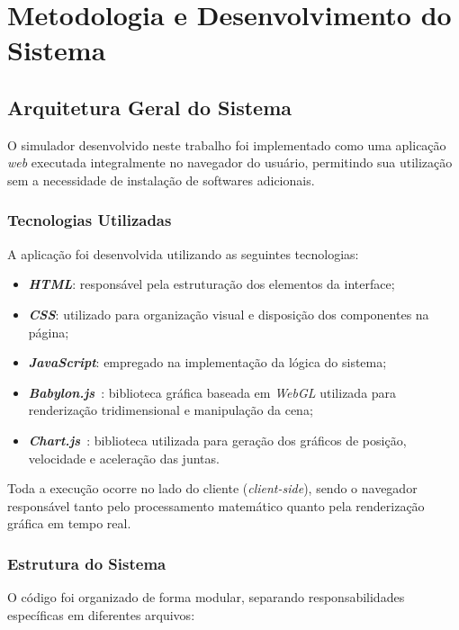 \chapter{Metodologia e Desenvolvimento do Sistema}

\section{Arquitetura Geral do Sistema}

O simulador desenvolvido neste trabalho foi implementado como uma aplicação \textit{web} executada integralmente no navegador do usuário, permitindo sua utilização sem a necessidade de instalação de softwares adicionais.


\subsection{Tecnologias Utilizadas}

A aplicação foi desenvolvida utilizando as seguintes tecnologias:

\begin{itemize}
    \item \textbf{\textit{HTML}}: responsável pela estruturação dos elementos da interface;
    \item \textbf{\textit{CSS}}: utilizado para organização visual e disposição dos componentes na página;
    \item \textbf{\textit{JavaScript}}: empregado na implementação da lógica do sistema;
    \item \textbf{\textit{Babylon.js}}~\cite{babylonjs}: biblioteca gráfica baseada em \textit{WebGL} utilizada para renderização tridimensional e manipulação da cena;
    \item \textbf{\textit{Chart.js}}~\cite{chartjs}: biblioteca utilizada para geração dos gráficos de posição, velocidade e aceleração das juntas.
\end{itemize}

Toda a execução ocorre no lado do cliente (\textit{client-side}), sendo o navegador responsável tanto pelo processamento matemático quanto pela renderização gráfica em tempo real.

\subsection{Estrutura do Sistema}

O código foi organizado de forma modular, separando responsabilidades específicas em diferentes arquivos:

